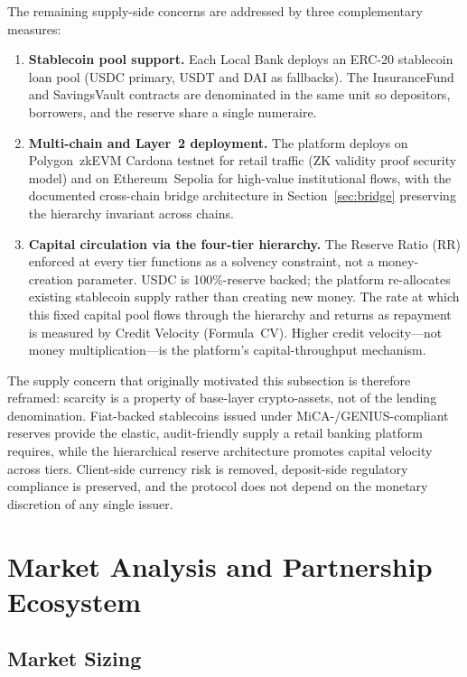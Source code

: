 \documentclass[12pt,a4paper]{report}
\begin{document}
The remaining supply-side concerns are addressed by three complementary measures:

\begin{enumerate}[noitemsep]
\item \textbf{Stablecoin pool support.} Each Local Bank deploys an ERC-20 stablecoin loan pool (USDC primary, USDT and DAI as fallbacks). The InsuranceFund and SavingsVault contracts are denominated in the same unit so depositors, borrowers, and the reserve share a single numeraire.
\item \textbf{Multi-chain and Layer~2 deployment.} The platform deploys on Polygon~zkEVM Cardona testnet for retail traffic (ZK validity proof security model) and on Ethereum~Sepolia for high-value institutional flows, with the documented cross-chain bridge architecture in Section~\ref{sec:bridge} preserving the hierarchy invariant across chains.
\item \textbf{Capital circulation via the four-tier hierarchy.} The Reserve Ratio (RR) enforced at every tier functions as a solvency constraint, not a money-creation parameter. USDC is 100\%-reserve backed; the platform re-allocates existing stablecoin supply rather than creating new money. The rate at which this fixed capital pool flows through the hierarchy and returns as repayment is measured by Credit Velocity (Formula~CV). Higher credit velocity---not money multiplication---is the platform's capital-throughput mechanism.
\end{enumerate}

The supply concern that originally motivated this subsection is therefore reframed: scarcity is a property of base-layer crypto-assets, not of the lending denomination. Fiat-backed stablecoins issued under MiCA-/GENIUS-compliant reserves provide the elastic, audit-friendly supply a retail banking platform requires, while the hierarchical reserve architecture promotes capital velocity across tiers. Client-side currency risk is removed, deposit-side regulatory compliance is preserved, and the protocol does not depend on the monetary discretion of any single issuer.

\section{Market Analysis and Partnership Ecosystem}

\subsection{Market Sizing}
\end{document}
